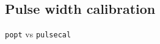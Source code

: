 \subsection{Pulse width calibration}
\label{subsec:poise/applications/pulsecal}

\texttt{popt} vs \texttt{pulsecal}

